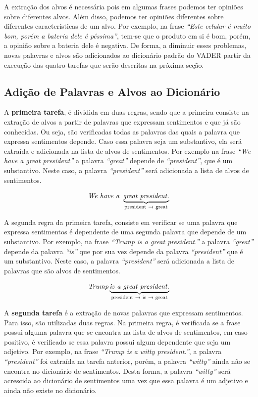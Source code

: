 A extração dos alvos é necessária pois em algumas frases
podemos ter opiniões sobre diferentes alvos. Além disso, podemos
ter opiniões diferentes sobre diferentes características de um alvo. Por
exemplo, na frase \textit{``Este celular é muito bom, porém a bateria dele é
péssima''}, tem-se que o produto em si é bom, porém, a opinião sobre a bateria
dele é negativa. De forma, a diminuir esses problemas, novas palavras e alvos
são adicionados ao dicionário padrão do \ac{VADER} partir da execução das quatro
tarefas que serão descritas na próxima seção.

\subsection{Adição de Palavras e Alvos ao Dicionário}

A \textbf{primeira tarefa}, é dividida em duas regras, sendo que a primeira
consiste na extração de alvos a partir de palavras que expressam sentimentos e
que já são conhecidas. Ou seja, são verificadas todas as palavras das quais a palavra que
expressa sentimentos depende. Caso essa palavra seja um substantivo, ela será
extraída e adicionada na lista de alvos de sentimentos. Por exemplo na frase \textit{``We have a great president''} a palavra \textit{``great''} depende de \textit{``president''}, que é um substantivo. Neste caso, a palavra \textit{``president''} será adicionada a
lista de alvos de sentimentos.

\[\textit{We have a } \underbrace{\textit{great president.}}_\text{president
\textrightarrow \text{ great}}\]

A segunda regra da primeira tarefa,
consiste em verificar se uma palavra que expressa sentimentos é dependente de
uma segunda palavra que depende de um substantivo.
Por exemplo, na frase \textit{``Trump is a great president.''} a palavra
\textit{``great''} depende da palavra \textit{``is''} que por sua vez depende da
palavra \textit{``president''} que é um substantivo. Neste caso, a palavra
\textit{``president''} será adicionada a lista de palavras que são alvos de sentimentos.

\[\textit{Trump} \underbrace{\textit{is a great president.}}_\text{president
\textrightarrow \text{ is} \textrightarrow \text{ great}}\]

A \textbf{segunda tarefa} é a extração de novas palavras que expressam
sentimentos. Para isso, são utilizadas duas regras. Na primeira regra, é
verificada se a frase possui alguma palavra que se encontra na lista de alvos de
sentimentos, em caso positivo, é verificado se essa palavra possui algum dependente que seja um adjetivo. Por exemplo, na frase \textit{``Trump is a witty president.''}, a palavra \textit{``president''} foi
extraída na tarefa anterior, porém, a palavra \textit{``witty''} ainda não se
encontra no dicionário de sentimentos.
Desta forma, a palavra \textit{``witty''} será acrescida ao
dicionário de sentimentos uma vez que essa palavra é um adjetivo e ainda não
existe no dicionário.


